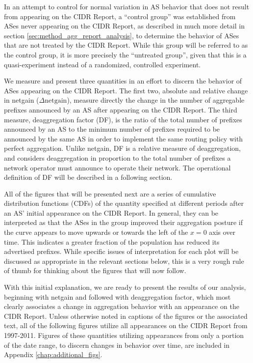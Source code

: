 In an attempt to control for normal variation in AS behavior that does not
result from appearing on the CIDR Report, a ``control group'' was established
from ASes never appearing on the CIDR Report, as described in much more detail
in section \ref{sec:method_agg_report_analysis}, to determine the behavior of
ASes that are not treated by the CIDR Report. While this group will be referred
to as the control group, it is more precisely the ``untreated group'', given
that this is a quasi-experiment instead of a randomized, controlled experiment.

We measure and present three quantities in an effort to discern the behavior of
ASes appearing on the CIDR Report. The first two, absolute and relative change
in netgain ($\Delta\textrm{netgain}$), measure directly the change in the
number of aggregable prefixes announced by an AS after appearing on the CIDR
Report. The third measure, deaggregation factor (DF), is the ratio of the total
number of prefixes announced by an AS to the minimum number of prefixes
required to be announced by the same AS in order to implement the same routing
policy with perfect aggregation. Unlike netgain, DF is a relative measure of
deaggregation, and considers deaggregation in proportion to the total number of
prefixes a network operator must announce to operate their network. The
operational definition of DF will be described in a following section.

All of the figures that will be presented next are a series of cumulative
distribution functions (CDFs) of the quantity specified at different periods
after an AS' initial appearance on the CIDR Report. In general, they can be
interpreted as that the ASes in the group improved their aggregation posture if
the curve appears to move upwards or towards the left of the $x=0$ axis over
time. This indicates a greater fraction of the population has reduced its
advertised prefixes. While specific issues of interpretation for each plot will
be discussed as appropriate in the relevant sections below, this is a very
rough rule of thumb for thinking about the figures that will now follow.

With this initial explanation, we are ready to present the results of our
analysis, beginning with netgain and followed with deaggregation factor, which
most clearly associates a change in aggregation behavior with an appearance on
the CIDR Report. Unless otherwise noted in captions of the figures or the
associated text, all of the following figures utilize all appearances on the
CIDR Report from 1997-2011.  Figures of these quantities utilizing appearances
from only a portion of the date range, to discern changes in behavior over
time, are included in Appendix \ref{chap:additional_figs}.

